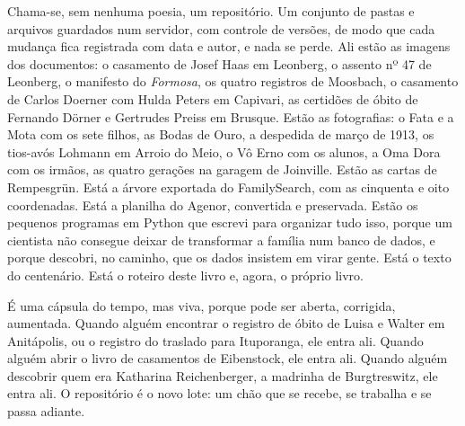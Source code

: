 \documentclass[
  brazilian,
  11pt,
  openany]{book}
\begin{document}
Chama-se, sem nenhuma poesia, um repositório. Um conjunto de pastas e
arquivos guardados num servidor, com controle de versões, de modo que
cada mudança fica registrada com data e autor, e nada se perde. Ali
estão as imagens dos documentos: o casamento de Josef Haas em Leonberg,
o assento nº 47 de Leonberg, o manifesto do \emph{Formosa}, os quatro
registros de Moosbach, o casamento de Carlos Doerner com Hulda Peters em
Capivari, as certidões de óbito de Fernando Dörner e Gertrudes Preiss em
Brusque. Estão as fotografias: o Fata e a Mota com os sete filhos, as
Bodas de Ouro, a despedida de março de 1913, os tios-avós Lohmann em
Arroio do Meio, o Vô Erno com os alunos, a Oma Dora com os irmãos, as
quatro gerações na garagem de Joinville. Estão as cartas de Rempesgrün.
Está a árvore exportada do FamilySearch, com as cinquenta e oito
coordenadas. Está a planilha do Agenor, convertida e preservada. Estão
os pequenos programas em Python que escrevi para organizar tudo isso,
porque um cientista não consegue deixar de transformar a família num
banco de dados, e porque descobri, no caminho, que os dados insistem em
virar gente. Está o texto do centenário. Está o roteiro deste livro e,
agora, o próprio livro.

É uma cápsula do tempo, mas viva, porque pode ser aberta, corrigida,
aumentada. Quando alguém encontrar o registro de óbito de Luisa e Walter
em Anitápolis, ou o registro do traslado para Ituporanga, ele entra ali.
Quando alguém abrir o livro de casamentos de Eibenstock, ele entra ali.
Quando alguém descobrir quem era Katharina Reichenberger, a madrinha de
Burgtreswitz, ele entra ali. O repositório é o novo lote: um chão que se
recebe, se trabalha e se passa adiante.
\end{document}
